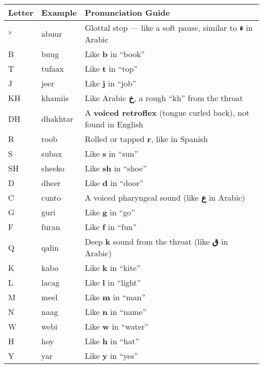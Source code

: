 \documentclass[
  a4paper,
  DIV=11,
  numbers=noendperiod]{scrartcl}
\begin{document}
\begin{longtable}[]{@{}
  >{\raggedright\arraybackslash}p{}
  >{\raggedright\arraybackslash}p{}
  >{\raggedright\arraybackslash}p{}@{}}
\toprule\noalign{}
\begin{minipage}[b]{\linewidth}\raggedright
Letter
\end{minipage} & \begin{minipage}[b]{\linewidth}\raggedright
Example
\end{minipage} & \begin{minipage}[b]{\linewidth}\raggedright
Pronunciation Guide
\end{minipage} \\
\midrule\noalign{}
\endhead
\bottomrule\noalign{}
\endlastfoot
ʾ & abuur & Glottal stop --- like a soft pause, similar to \textbf{ء} in
Arabic \\
B & buug & Like \textbf{b} in ``book'' \\
T & tufaax & Like \textbf{t} in ``top'' \\
J & jeer & Like \textbf{j} in ``job'' \\
KH & khamiis & Like Arabic \textbf{خ}, a rough ``kh'' from the throat \\
DH & dhakhtar & A \textbf{voiced retroflex} (tongue curled back), not
found in English \\
R & roob & Rolled or tapped \textbf{r}, like in Spanish \\
S & subax & Like \textbf{s} in ``sun'' \\
SH & sheeko & Like \textbf{sh} in ``shoe'' \\
D & dheer & Like \textbf{d} in ``door'' \\
C & cunto & A voiced pharyngeal sound (like \textbf{ع} in Arabic) \\
G & guri & Like \textbf{g} in ``go'' \\
F & furan & Like \textbf{f} in ``fun'' \\
Q & qalin & Deep \textbf{k} sound from the throat (like \textbf{ق} in
Arabic) \\
K & kabo & Like \textbf{k} in ``kite'' \\
L & lacag & Like \textbf{l} in ``light'' \\
M & meel & Like \textbf{m} in ``man'' \\
N & naag & Like \textbf{n} in ``name'' \\
W & webi & Like \textbf{w} in ``water'' \\
H & hoy & Like \textbf{h} in ``hat'' \\
Y & yar & Like \textbf{y} in ``yes'' \\
\end{longtable}
\end{document}
